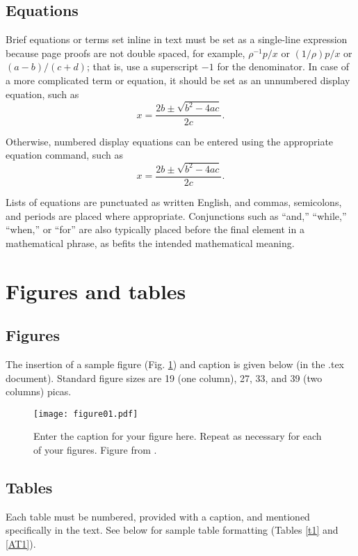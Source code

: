 \documentclass{ametsocV6.1}
\begin{document}
\subsection{Equations}
Brief equations or terms set inline in text must be set as a single-line
expression because page proofs are not double spaced, for example,
$\rho^{-1}p/x$ or $(1/{\rho})p/x$ or $(a-b)/(c+d)$; that is, use a
superscript $-1$ for the denominator. In case of a more complicated term or
equation, it should be set as an unnumbered display equation, such as
\begin{displaymath} x=\frac{2b\pm\sqrt{b^{2}-4ac}}{2c}.  \end{displaymath}

Otherwise, numbered display equations can be entered using the appropriate
equation command, such as \begin{equation}
x=\frac{2b\pm\sqrt{b^{2}-4ac}}{2c}.  \end{equation}

Lists of equations are punctuated as written English, and commas, semicolons,
and periods are placed where appropriate. Conjunctions such as ``and,''
``while,'' ``when,'' or ``for'' are also typically placed before the final
element in a mathematical phrase, as befits the intended mathematical
meaning.

\section{Figures and tables}

\subsection{Figures}
The insertion of a sample figure (Fig. \ref{f1})
and caption is given below (in the .tex document). Standard figure sizes are 19 (one column),
27, 33, and 39 (two columns) picas.

\begin{figure}[h]
 \centerline{\texttt{[image: figure01.pdf]}}
  \caption{Enter the caption for your figure here.  Repeat as
  necessary for each of your figures. Figure from \protect\cite{Knutti2008}.}\label{f1}
\end{figure}


\subsection{Tables}
Each table must be numbered, provided with a caption, and mentioned
specifically in the text. See below for sample table formatting (Tables \ref{t1} and \ref{AT1}).
\end{document}
